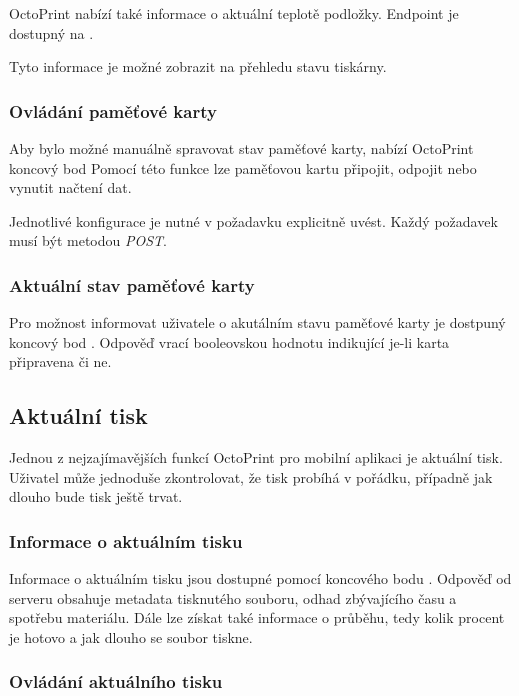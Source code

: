 OctoPrint nabízí také informace o aktuální teplotě podložky.
Endpoint je dostupný na .

Tyto informace je možné zobrazit na přehledu stavu tiskárny.

\subsubsection*{Ovládání paměťové karty}

Aby bylo možné manuálně spravovat stav paměťové karty, nabízí OctoPrint koncový bod 
Pomocí této funkce lze paměťovou kartu připojit, odpojit nebo vynutit načtení dat.

Jednotlivé konfigurace je nutné v požadavku explicitně uvést.
Každý požadavek musí být metodou \textit{POST}.

\subsubsection*{Aktuální stav paměťové karty}

Pro možnost informovat uživatele o akutálním stavu paměťové karty je dostpuný koncový bod .
Odpověď vrací booleovskou hodnotu indikující je-li karta připravena či ne.

\subsection{Aktuální tisk}

Jednou z nejzajímavějších funkcí OctoPrint pro mobilní aplikaci je aktuální tisk.
Uživatel může jednoduše zkontrolovat, že tisk probíhá v pořádku, případně jak dlouho bude tisk ještě trvat.

\subsubsection*{Informace o aktuálním tisku}

Informace o aktuálním tisku jsou dostupné pomocí koncového bodu .
Odpověď od serveru obsahuje metadata tisknutého souboru, odhad zbývajícího času a spotřebu materiálu.
Dále lze získat také informace o průběhu, tedy kolik procent je hotovo a jak dlouho se soubor tiskne.

\subsubsection*{Ovládání aktuálního tisku}

